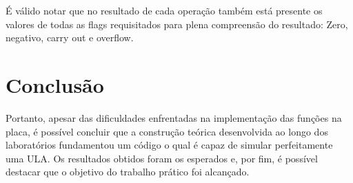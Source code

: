 \documentclass[a4paper, 12pt]{article}
\begin{document}
É válido notar que no resultado de cada operação também está presente os valores de todas as flags requisitados para plena compreensão do resultado: Zero, negativo, carry out e overflow.

\section{Conclusão}

Portanto, apesar das dificuldades enfrentadas na implementação das funções na placa, é possível concluir que a construção teórica desenvolvida ao longo dos laboratórios fundamentou um código o qual é capaz de simular perfeitamente uma ULA. Os resultados obtidos foram os esperados e, por fim, é possível destacar que o objetivo do trabalho prático foi alcançado.
\end{document}
